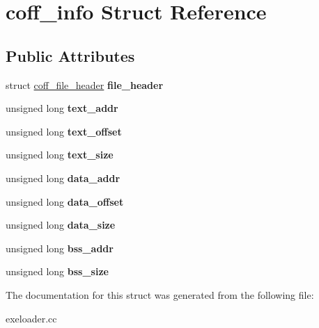 \hypertarget{structcoff__info}{
\section{coff\_\-info Struct Reference}
\label{structcoff__info}
}
\subsection*{Public Attributes}
\begin{DoxyCompactItemize}
\item 
\hypertarget{structcoff__info_ad6693cb0774b3b9a362049a0fdc4b14d}{
struct \hyperlink{structcoff__file__header}{coff\_\-file\_\-header} {\bfseries file\_\-header}}
\label{structcoff__info_ad6693cb0774b3b9a362049a0fdc4b14d}

\item 
\hypertarget{structcoff__info_a6cbe24985910403a898061fd8f09b325}{
unsigned long {\bfseries text\_\-addr}}
\label{structcoff__info_a6cbe24985910403a898061fd8f09b325}

\item 
\hypertarget{structcoff__info_aa9974d1ed5725878f3dc9c545163d45e}{
unsigned long {\bfseries text\_\-offset}}
\label{structcoff__info_aa9974d1ed5725878f3dc9c545163d45e}

\item 
\hypertarget{structcoff__info_ac9fe9564416b27391a61e3792ca62cc5}{
unsigned long {\bfseries text\_\-size}}
\label{structcoff__info_ac9fe9564416b27391a61e3792ca62cc5}

\item 
\hypertarget{structcoff__info_aac90a49e63ce4bb8f2c3c6dd5565290b}{
unsigned long {\bfseries data\_\-addr}}
\label{structcoff__info_aac90a49e63ce4bb8f2c3c6dd5565290b}

\item 
\hypertarget{structcoff__info_ad6888212f9aecd7d732f27a70d2e983d}{
unsigned long {\bfseries data\_\-offset}}
\label{structcoff__info_ad6888212f9aecd7d732f27a70d2e983d}

\item 
\hypertarget{structcoff__info_a985296bbaa2c7e5a2da7ebcc2ca70ae7}{
unsigned long {\bfseries data\_\-size}}
\label{structcoff__info_a985296bbaa2c7e5a2da7ebcc2ca70ae7}

\item 
\hypertarget{structcoff__info_a398603a664d7a43ab54b93cea5374802}{
unsigned long {\bfseries bss\_\-addr}}
\label{structcoff__info_a398603a664d7a43ab54b93cea5374802}

\item 
\hypertarget{structcoff__info_ae646d9e0c4d5215142a669a8ede686a7}{
unsigned long {\bfseries bss\_\-size}}
\label{structcoff__info_ae646d9e0c4d5215142a669a8ede686a7}

\end{DoxyCompactItemize}


The documentation for this struct was generated from the following file:\begin{DoxyCompactItemize}
\item 
exeloader.cc\end{DoxyCompactItemize}
